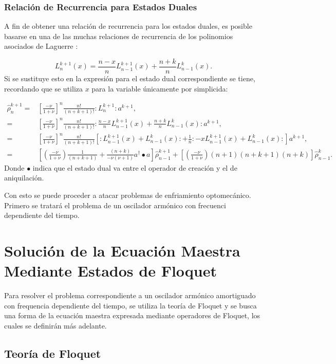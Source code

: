 \documentclass[a4paper,10pt]{report}
\begin{document}
\subsection{Relación de Recurrencia para Estados Duales}

A fin de obtener una relación de recurrencia para los estados duales, es posible basarse en una de las muchas relaciones de recurrencia de los polinomios asociados de Laguerre \cite{ArfkenMM}:

\begin{equation}
L_n^{k+1}(x) = \frac{n-x}{n}L_{n-1}^{k+1}(x) + \frac{n+k}{n}L_{n-1}^{k}(x).
\end{equation} Si se sustituye esto en la expresión para el estado dual correspondiente se tiene, recordando que se utiliza $x$ para la variable únicamente por simplicida:

\begin{align}
\hat{\rho}_n ^{k+1} =& [\frac{-\nu}{1+\nu}]^n \frac{n!}{(n+k+1)!} :L_n^{k+1}:a^{k+1},\\
=&[\frac{-\nu}{1+\nu}]^n\frac{n!}{(n+k+1)!} :\frac{n-x}{n}L_{n-1}^{k+1}(x) + \frac{n+k}{n}L_{n-1}^{k}(x):a^{k+1},\\
=&[\frac{-\nu}{1+\nu}]^n\frac{n!}{(n+k+1)!}[:L_{n-1}^{k+1}(x)+L_{n-1}^{k}(x):+\frac{1}{n}:-xL_{n-1}^{k+1}(x)+L_{n-1}^{k}(x):]a^{k+1},\\
=&[(\frac{-\nu}{1+\nu})\frac{1}{(n+k+1)}+ \frac{(n+k)}{-\nu(\nu+1)}a^\dagger \bullet a]\hat{\rho}_{n-1} ^{k+1} + [(\frac{-\nu}{1+\nu}) (n+1)(n+k+1)(n+k)]\hat{\rho}_{n-1} ^{k}.
\end{align} Donde $\bullet$ indica que el estado dual va entre el operador de creación y el de aniquilación.

Con esto se puede proceder a atacar problemas de enfriamiento optomecánico. Primero se tratará el problema de un oscilador armónico con frecuenci dependiente del tiempo.


\chapter{Solución de la Ecuación Maestra Mediante Estados de Floquet}

Para resolver el problema correspondiente a un oscilador armónico amortiguado con frequencia dependiente del tiempo, se utiliza la teoría de Floquet \cite{WardFT}y se busca una forma de la ecuación maestra expresada mediante operadores de Floquet, los cuales se definirán más adelante.

\section{Teoría de Floquet}
\end{document}
